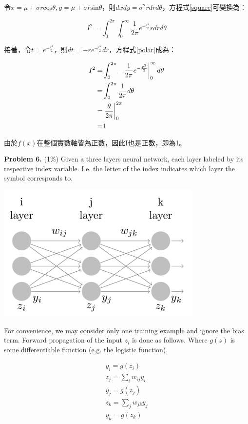 \documentclass{article}
\newcommand\rsx[1]{\left.{#1}\vphantom{\big|}\right|}
\begin{document}
令$x=\mu+\sigma r \textrm{cos}\theta, y=\mu+\sigma r \textrm{sin}\theta$，則$dx dy=\sigma^2 r dr d\theta$，方程式\ref{square}可變換為：

\begin{equation}\label{polar}
I^2=\int_{0}^{2\pi}\int_{0}^{\infty}\frac{1}{2\pi}e^{-\frac{r^2}{2}}rdrd\theta
\end{equation}

接著，令$t=e^{-\frac{r^2}{2}}$，則$dt=-re^{-\frac{r^2}{2}}dr$，方程式\ref{polar}成為：

\begin{equation}
\begin{aligned}
I^2
=&\int_{0}^{2\pi}\rsx{-\frac{1}{2\pi}e^{-\frac{r^2}{2}}}_{0}^{\infty}d\theta\\
=&\int_{0}^{2\pi}\frac{1}{2\pi}d\theta\\
=&\rsx{\frac{\theta}{2\pi}}_{0}^{2\pi}\\
=&1
\end{aligned}
\end{equation}

由於$f(x)$在整個實數軸皆為正數，因此I也是正數，即為1。

\textbf{Problem 6.} (1\%) Given a three layers neural network, each layer labeled by its respective index variable. I.e. the letter of the index indicates which layer the symbol corresponds to.

\begin{center}
\includegraphics{network}
\end{center}

For convenience, we may consider only one training example and ignore the bias term. Forward propagation of the input $z_i$ is done as follows. Where $g(z)$ is some differentiable function (e.g. the logistic function).

\begin{equation*}
\begin{aligned}
y_i = g(z_i)\\
z_j = \sum_{i}^{}w_{ij}y_i\\
y_j = g(z_j)\\
z_k = \sum_{j}^{}w_{jk}y_j\\
y_k = g(z_k)
\end{aligned}
\end{equation*}
\end{document}
